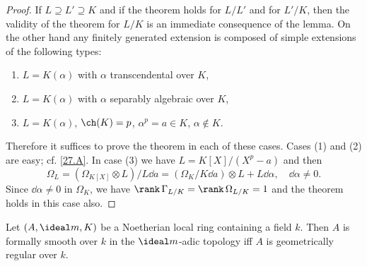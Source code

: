 \documentclass[../main]{subfiles}
\begin{document}
\begin{proof}
If $L \supseteq L' \supseteq K$ and if the theorem holds for $L/L'$ and for $L'/K$, then the validity of the theorem for $L/K$ is an immediate consequence of the lemma. On the other hand any finitely generated extension is composed of simple extensions of the following types: 
\begin{enumerate}[label = (\arabic*)]
    \item $L = K(\alpha)$ with $\alpha$ transcendental over $K$,
    \item $L = K(\alpha)$ with $\alpha$ separably algebraic over $K$,
    \item $L = K(\alpha)$, $\ch(K) = p$, $\alpha^p = a \in K$, $\alpha \not \in K$.
\end{enumerate}
Therefore it suffices to prove the theorem in each of these cases. Cases (1) and (2) are easy; cf. \ref{27.A}. In case (3) we have $L = K[X]/(X^p - a)$ and then \[\Omega_L = (\Omega_{K[X]} \otimes L)/L \dd a = (\Omega_K/K \dd a) \otimes L + L \dd \alpha,\quad \dd \alpha \ne 0.\] Since $\dd \alpha \ne 0$ in $\Omega_K$, we have $\rank \, \Gamma_{L/K} = \rank \, \Omega_{L/K} = 1$ and the theorem holds in this case also. 
\end{proof}

\begin{partheorem}\label{thm:093}
Let $(A, \ideal m, K)$ be a Noetherian local ring containing a field $k$. Then $A$ is formally smooth over $k$ in the $\ideal m$-adic topology iff $A$ is geometrically regular over $k$. 
\end{partheorem}
\end{document}
